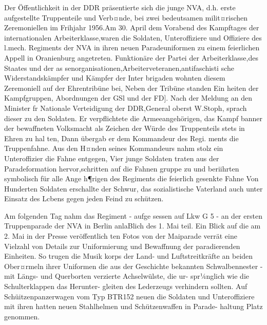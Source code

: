 

Der Öffentlichkeit in der DDR präsentierte sich
die junge NVA, d.h. erste aufgestellte Truppenteile
und Verb¤nde, bei zwei bedeutsamen milit¤rischen
Zeremoniellen im Frihjahr 1956.Am 30. April
dem Vorabend des Kampftages der internationalen
Arbeiterklasse,waren die Soldaten, Unteroffiziere
und Offiziere des l.mech. Regiments der NVA in
ihren neuen Paradeuniformen zu einem feierlichen
Appell in Oranienburg angetreten. Funktionäre der
Partei der Arbeiterklasse,des Staates und der as
senorganisationen,Arbeiterveteranen,antifaschisti
sche Widerstandskämpfer und Kämpfer der Inter
brigaden wohnten diesem Zeremoniell auf der
Ehrentribüne bei, Neben der Tribüne standen Ein
heiten der Kampfgruppen, Abordnungen der GSl
und der FD]. Nach der Meldung an den Minister
fr Nationale Verteidigung der DDR,General
oberst W.Stoph, sprach dieser zu den Soldaten. Er
verpflichtete die Armeeangehörigen, das Kampf
banner der bewaffneten Volksmacht als Zeichen
der Würde des Truppenteils stets in Ehren zu hal
ten, Dann übergab er dem Kommandeur des Regi.
ments die Truppenfahne. Aus den H¤nden seines
Kommandeurs nahm stolz ein Unteroffizier die
Fahne entgegen, Vier junge Soldaten traten aus der
Paradeformation hervor,schritten auf die Fahnen
gruppe zu und beriihrten symbolisch für alle Ange
h¶rigen des Regiments die feierlich gesenkte Fahne
Von Hunderten Soldaten erschallte der Schwur,
das sozialistische Vaterland auch unter Einsatz des
Lcbens gegen jeden Feind zu schützen.

Am folgenden Tag nahm das Regiment - aufge
sessen auf Lkw G 5 - an der ersten Truppenparade
der NVA in Berlin anlaBlich des 1. Mai teil. Ein
Blick auf die am 2. Mai in der Presse veröffentlich
ten Fotos von der Maiparade verrät eine Vielzahl
von Details zur Uniformierung und Bewaffnung
der paradierenden Einheiten. So trugen die Musik
korps der Land- und Luftstreitkräfte an beiden
Ober¤rmeln ihrer Uniformen die aus der Geschichte bekannten Schwalbennester - mit Längs-
und Querborten verzierte Achselwülste, die ur-
spr¼nglich wie die Schulterklappen das Herunter-
gleiten des Lederzeugs verhindern sollten. Auf
Schüitzenpanzerwagen vom Typ BTR152
neuen
die Soldaten und Unteroffiziere mit ihren
hatten
neuen Stahlhelmen und Schützenwaffen in Parade-
haltung Platz genommen.